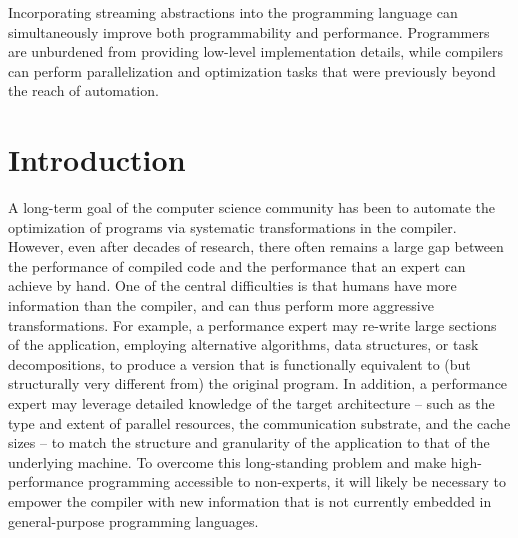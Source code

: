 

Incorporating streaming abstractions into the programming language can
simultaneously improve both programmability and performance.
Programmers are unburdened from providing low-level implementation
details, while compilers can perform parallelization and optimization
tasks that were previously beyond the reach of automation.

\section{Introduction}

A long-term goal of the computer science community has been to
automate the optimization of programs via systematic transformations
in the compiler.  However, even after decades of research, there often
remains a large gap between the performance of compiled code and the
performance that an expert can achieve by hand.  One of the central
difficulties is that humans have more information than the compiler,
and can thus perform more aggressive transformations.  For example, a
performance expert may re-write large sections of the application,
employing alternative algorithms, data structures, or task
decompositions, to produce a version that is functionally equivalent
to (but structurally very different from) the original program.  In
addition, a performance expert may leverage detailed knowledge of the
target architecture -- such as the type and extent of parallel
resources, the communication substrate, and the cache sizes -- to
match the structure and granularity of the application to that of the
underlying machine.  To overcome this long-standing problem and make
high-performance programming accessible to non-experts, it will likely
be necessary to empower the compiler with new information that is not
currently embedded in general-purpose programming languages.

